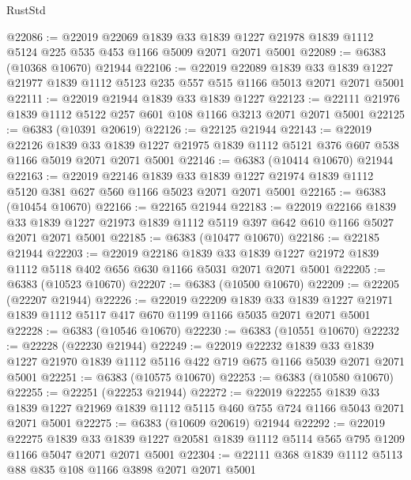 \begin{lexlean}{RustStd}
\begin{coremodule}
@22086 := @22019
    @22069
    @1839
    @33
    @1839
    @1227
    @21978
    @1839
    @1112
    @5124
    @225
    @535
    @453
    @1166
    @5009
    @2071
    @2071
    @5001
@22089 := @6383 (@10368 @10670) @21944
@22106 := @22019
    @22089
    @1839
    @33
    @1839
    @1227
    @21977
    @1839
    @1112
    @5123
    @235
    @557
    @515
    @1166
    @5013
    @2071
    @2071
    @5001
@22111 := @22019 @21944 @1839 @33 @1839 @1227
@22123 := @22111 @21976 @1839 @1112 @5122 @257 @601 @108 @1166 @3213 @2071 @2071 @5001
@22125 := @6383 (@10391 @20619)
@22126 := @22125 @21944
@22143 := @22019
    @22126
    @1839
    @33
    @1839
    @1227
    @21975
    @1839
    @1112
    @5121
    @376
    @607
    @538
    @1166
    @5019
    @2071
    @2071
    @5001
@22146 := @6383 (@10414 @10670) @21944
@22163 := @22019
    @22146
    @1839
    @33
    @1839
    @1227
    @21974
    @1839
    @1112
    @5120
    @381
    @627
    @560
    @1166
    @5023
    @2071
    @2071
    @5001
@22165 := @6383 (@10454 @10670)
@22166 := @22165 @21944
@22183 := @22019
    @22166
    @1839
    @33
    @1839
    @1227
    @21973
    @1839
    @1112
    @5119
    @397
    @642
    @610
    @1166
    @5027
    @2071
    @2071
    @5001
@22185 := @6383 (@10477 @10670)
@22186 := @22185 @21944
@22203 := @22019
    @22186
    @1839
    @33
    @1839
    @1227
    @21972
    @1839
    @1112
    @5118
    @402
    @656
    @630
    @1166
    @5031
    @2071
    @2071
    @5001
@22205 := @6383 (@10523 @10670)
@22207 := @6383 (@10500 @10670)
@22209 := @22205 (@22207 @21944)
@22226 := @22019
    @22209
    @1839
    @33
    @1839
    @1227
    @21971
    @1839
    @1112
    @5117
    @417
    @670
    @1199
    @1166
    @5035
    @2071
    @2071
    @5001
@22228 := @6383 (@10546 @10670)
@22230 := @6383 (@10551 @10670)
@22232 := @22228 (@22230 @21944)
@22249 := @22019
    @22232
    @1839
    @33
    @1839
    @1227
    @21970
    @1839
    @1112
    @5116
    @422
    @719
    @675
    @1166
    @5039
    @2071
    @2071
    @5001
@22251 := @6383 (@10575 @10670)
@22253 := @6383 (@10580 @10670)
@22255 := @22251 (@22253 @21944)
@22272 := @22019
    @22255
    @1839
    @33
    @1839
    @1227
    @21969
    @1839
    @1112
    @5115
    @460
    @755
    @724
    @1166
    @5043
    @2071
    @2071
    @5001
@22275 := @6383 (@10609 @20619) @21944
@22292 := @22019
    @22275
    @1839
    @33
    @1839
    @1227
    @20581
    @1839
    @1112
    @5114
    @565
    @795
    @1209
    @1166
    @5047
    @2071
    @2071
    @5001
@22304 := @22111 @368 @1839 @1112 @5113 @88 @835 @108 @1166 @3898 @2071 @2071 @5001

\end{coremodule}
\end{lexlean}
